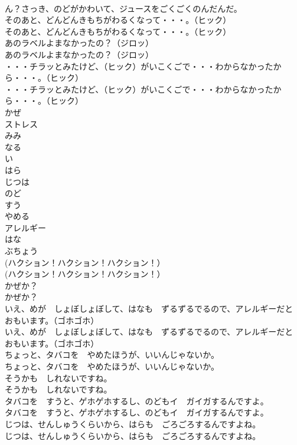 \documentclass[8pt]{extreport}
\begin{document}
\begin{CJK}{UTF8}{min}
\\	ん？さっき、のどがかわいて、ジュースをごくごくのんだんだ。 
\\	そのあと、どんどんきもちがわるくなって・・・。（ヒック）	
\\	そのあと、どんどんきもちがわるくなって・・・。（ヒック） 
\\	あのラベルよまなかったの？（ジロッ）	
\\	あのラベルよまなかったの？（ジロッ） 
\\	・・・チラッとみたけど、（ヒック）がいこくごで・・・わからなかったから・・・。（ヒック）	
\\	・・・チラッとみたけど、（ヒック）がいこくごで・・・わからなかったから・・・。（ヒック） 
\\	かぜ
\\	ストレス
\\	みみ
\\	なる
\\	い
\\	はら
\\	じつは
\\	のど
\\	すう
\\	やめる
\\	アレルギー
\\	はな
\\	ぶちょう
\\	(ハクション！ハクション！ハクション！）	
\\	(ハクション！ハクション！ハクション！） 
\\	かぜか？	
\\	かぜか？ 
\\	いえ、めが　しょぼしょぼして、はなも　ずるずるでるので、アレルギーだと　おもいます。（ゴホゴホ）	
\\	いえ、めが　しょぼしょぼして、はなも　ずるずるでるので、アレルギーだと　おもいます。（ゴホゴホ） 
\\	ちょっと、タバコを　やめたほうが、いいんじゃないか。	
\\	ちょっと、タバコを　やめたほうが、いいんじゃないか。 
\\	そうかも　しれないですね。	
\\	そうかも　しれないですね。 
\\	タバコを　すうと、ゲホゲホするし、のどもイ　ガイガするんですよ。	
\\	タバコを　すうと、ゲホゲホするし、のどもイ　ガイガするんですよ。 
\\	じつは、せんしゅうくらいから、はらも　ごろごろするんですよね。	
\\	じつは、せんしゅうくらいから、はらも　ごろごろするんですよね。 

\end{CJK}
\end{document}
